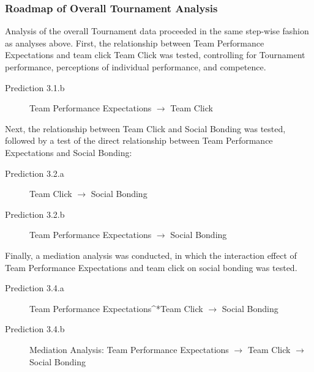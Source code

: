 {\subsubsection{Roadmap of Overall Tournament Analysis}
Analysis of the overall Tournament data proceeded in the same step-wise fashion as analyses above. First, the relationship between Team Performance Expectations and team click Team Click was tested, controlling for Tournament performance, perceptions of individual performance, and competence.

\begin{description}
  \item [Prediction 3.1.b] Team Performance Expectations $\rightarrow$ Team Click
\end{description}

Next, the relationship between Team Click and Social Bonding was tested, followed by a test of the direct relationship between Team Performance Expectations and Social Bonding:

\begin{description}
  \item [Prediction 3.2.a] Team Click $\rightarrow$ Social Bonding
  \item [Prediction 3.2.b] Team Performance Expectations $\rightarrow$ Social Bonding
\end{description}
\bigskip
Finally, a mediation analysis was conducted, in which the interaction effect of Team Performance Expectations and team click on social bonding was tested.
\bigskip
\begin{description}
\item[Prediction 3.4.a] Team Performance Expectations^*Team Click  $\rightarrow$ Social Bonding
\item[Prediction 3.4.b] Mediation Analysis: Team Performance Expectations $\rightarrow$ Team Click $\rightarrow$ Social Bonding
\end{description}
\clearpage






}
